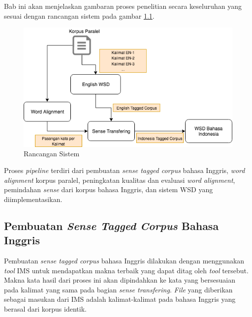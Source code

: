 \chapter{\babTiga}
Bab ini akan menjelaskan gambaran proses penelitian secara keseluruhan yang sesuai dengan rancangan sistem pada gambar \ref{fig:Rancangan-Sistem}.

\begin{figure}
	\centering
	\includegraphics[width=1\linewidth]{adit_pics/WSD-full}
	\caption{Rancangan Sistem}
	\label{fig:Rancangan-Sistem}
\end{figure}

Proses \textit{pipeline} terdiri dari pembuatan \textit{sense tagged corpus} bahasa Inggris,  \textit{word alignment} korpus paralel, peningkatan kualitas dan evaluasi \textit{word alignment}, pemindahan \textit{sense} dari korpus bahasa Inggris, dan sistem WSD yang diimplementasikan.

\section{Pembuatan \textit{Sense Tagged Corpus} Bahasa Inggris}

Pembuatan \textit{sense tagged corpus} bahasa Inggris dilakukan dengan menggunakan \textit{tool} IMS \citep{zhong2010makes} untuk mendapatkan makna terbaik yang dapat ditag oleh \textit{tool} tersebut. Makna kata hasil dari proses ini akan dipindahkan ke kata yang bersesuaian pada kalimat yang sama pada bagian \textit{sense transfering}. \textit{File} yang diberikan sebagai masukan dari IMS adalah kalimat-kalimat pada bahasa Inggris yang berasal dari korpus identik.
